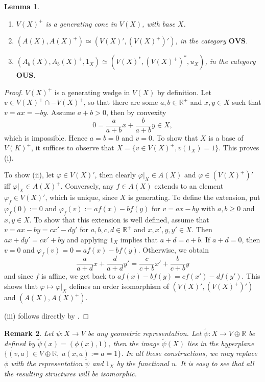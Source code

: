 \documentclass[12pt,letterpaper]{article}
\newtheorem{lemma}{Lemma}[section]
\newtheorem{remark}[lemma]{Remark}
\newcommand{\ct}[1]{\mathbf{#1}}
\begin{document}
\begin{lemma} %
\begin{enumerate}
\item[(i)] $V(X)^+$ is a generating cone in $V(X)$, with base $X$.
\item[(ii)] $(A(X),A(X)^+)\simeq (V(X)',(V(X)^+)')$, in the category $\ct{OVS}$.
\item[(iii)] $(A_b(X),A_b(X)^+,1_X)\simeq (V(X)^*,(V(X)^+)^*,u_X)$, in the category $\ct{OUS}$.
\end{enumerate}

\end{lemma}

\begin{proof} $V(X)^+$ is a generating wedge in $V(X)$ by definition. Let $v\in V(X)^+\cap -V(X)^+$, so that there are some $a,b\in \mathbb R^+$ and $x,y\in X$ such that 
$v=ax=-by$. Assume $a+b>0$, then by convexity 
\[
0=\frac a{a+b}x+\frac b{a+b}y\in X,
\]
 which is impossible. Hence $a=b=0$ and $v=0$. To show that $X$ is a base of $V(K)^+$, it suffices to observe that $X=\{v\in V(X)^+, v(1_X)=1\}$. This proves (i).

To show (ii), let $\varphi\in V(X)'$, then clearly $\varphi|_X\in A(X)$ and $\varphi\in (V(X)^+)'$ iff $\varphi|_X\in A(X)^+$. Conversely, any  $f\in A(X)$ extends to an element $\varphi_f\in V(X)'$, which is unique, since 
 $X$ is generating. To define the extension, put  $\varphi_f(0):=0$ and  $\varphi_f(v):=af(x)-bf(y)$ for  $v=ax-by$ with $a,b\ge 0$ and $x,y\in X$. 
 To show that this  extension is well defined, assume that $v=ax-by=cx'-dy'$ for $a,b,c,d\in \mathbb R^+$ and $x,x',y,y'\in X$. Then $ax+dy'=cx'+by$ and applying $1_X$ implies that $a+d=c+b$.
 If $a+d=0$, then $v=0$ and $\varphi_f(v)=0=af(x)-bf(y)$. Otherwise, we obtain 
 \[
\frac a{a+d}x+ \frac d{a+d}y'=\frac c{c+b} x'+\frac b{c+b} y
 \]
and since $f$ is affine, we get back to $af(x)-bf(y)=cf(x')-df(y')$. This shows that  $\varphi\mapsto \varphi|_X$ defines an order isomorphism of $(V(X)',(V(X)^+)')$ and 
$(A(X),A(X)^+)$.

(iii) follows directly by \cite[Theorem 2 (iii)]{ovs}.

\end{proof}

\begin{remark} Let $\psi:X\to V$ be  any geometric representation.  Let $\tilde \psi:X\to V\oplus \mathbb R$ be defined by $\tilde \psi(x)=(\phi(x),1)$, then the image 
$\tilde \psi(X)$ lies in the hyperplane $\{(v,a)\in V\oplus \mathbb R,\ u(x,a):=a=1\}$. In all these constructions, we may replace $\phi$ with the representation $\tilde \psi$ and $1_X$ by the functional $u$.  It is easy to see that all the resulting structures will be isomorphic.

\end{remark}
\end{document}
